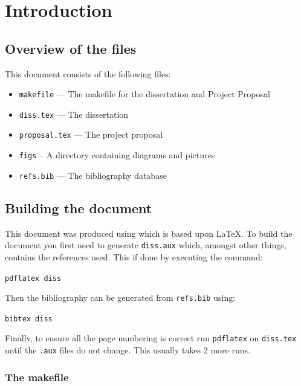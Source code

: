 \documentclass[12pt,a4paper,twoside,openright]{report}
\begin{document}

\pagestyle{headings}

\chapter{Introduction}

\section{Overview of the files}

This document consists of the following files:

\begin{itemize}
\item \texttt{makefile} --- The makefile for the dissertation and
                         Project Proposal
\item \texttt{diss.tex} --- The dissertation
\item \texttt{proposal.tex}  --- The project proposal 
\item \texttt{figs} -- A directory containing diagrams and pictures
\item \texttt{refs.bib} --- The bibliography database
\end{itemize}

\section{Building the document}

This document was produced using \LaTeXe which is based upon
\LaTeX.  To build the document you first need to
generate \texttt{diss.aux} which, amongst other things, contains the
references used.  This if done by executing the command:

\texttt{pdflatex diss}

\noindent
Then the bibliography can be generated from \texttt{refs.bib} using:

\texttt{bibtex diss}

\noindent
Finally, to ensure all the page numbering is correct run \texttt{pdflatex}
on \texttt{diss.tex} until the \texttt{.aux} files do not change.  This
usually takes 2 more runs.

\subsection{The makefile}
\end{document}
